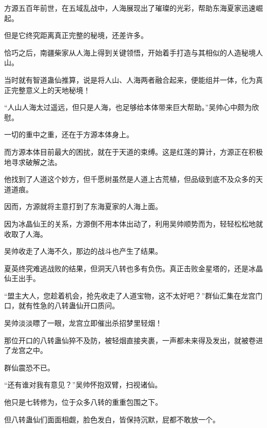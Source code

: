 \begin{this_body}
方源五百年前世，在五域乱战中，人海展现出了璀璨的光彩，帮助东海夏家迅速崛起。

但是它终究距离真正完整的秘境，还差许多。

恰巧之后，南疆柴家从人海上得到关键领悟，开始着手打造与其相似的人造秘境人山。

当时就有智道蛊仙推算，说是将人山、人海两者融合起来，便能组并一体，化为真正完整意义上的天地秘境！

“人山人海太过遥远，但只是人海，也足够给本体带来巨大帮助。”吴帅心中颇为欣慰。

一切的重中之重，还在于方源本体身上。

而方源本体目前最大的困扰，就在于天道的束缚。这是红莲的算计，方源正在积极地寻求破解之法。

他找到了人道这个妙方，但千愿树虽然是人道上古荒植，但品级到底不及众多的天道道痕。

因而，方源就将主意打到了东海夏家的人海上面。

因为冰晶仙王的关系，方源倒不用本体出动了，利用吴帅顺势而为，轻轻松松地就收取了人海。

吴帅收走了人海不久，那边的战斗也产生了结果。

夏英终究难逃战败的结果，但洞天八转也多有负伤。真正击败金星塔的，还是冰晶仙王出手。

“盟主大人，您趁着机会，抢先收走了人道宝物，这不太好吧？”群仙汇集在龙宫门口，就有性急的八转蛊仙开口质问。

吴帅淡淡瞟了一眼，龙宫立即催出杀招梦里轻烟！

那位开口的八转蛊仙猝不及防，被轻烟直接夹裹，一声都未来得及发出，就被卷进了龙宫之中。

群仙震恐不已。

“还有谁对我有意见？”吴帅怀抱双臂，扫视诸仙。

他只是七转修为，位于众多八转的重重包围之下。

但八转蛊仙们面面相觑，脸色发白，皆保持沉默，屁都不敢放一个。

\end{this_body}

